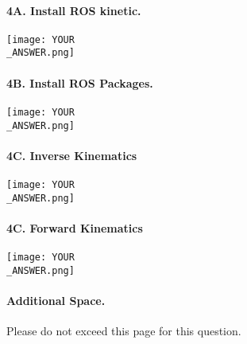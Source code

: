
\paragraph{4A. Install ROS kinetic.}
\begin{center}
    \texttt{[image: YOUR\\\_ANSWER.png]}
\end{center}

\paragraph{4B. Install ROS Packages.}
\begin{center}
    \texttt{[image: YOUR\\\_ANSWER.png]}
\end{center}

\newpage
\paragraph{4C. Inverse Kinematics}
\begin{center}
    \texttt{[image: YOUR\\\_ANSWER.png]}
\end{center}

\paragraph{4C. Forward Kinematics}
\begin{center}
    \texttt{[image: YOUR\\\_ANSWER.png]}
\end{center}

\newpage
\paragraph{Additional Space.}
Please do not exceed this page for this question.
